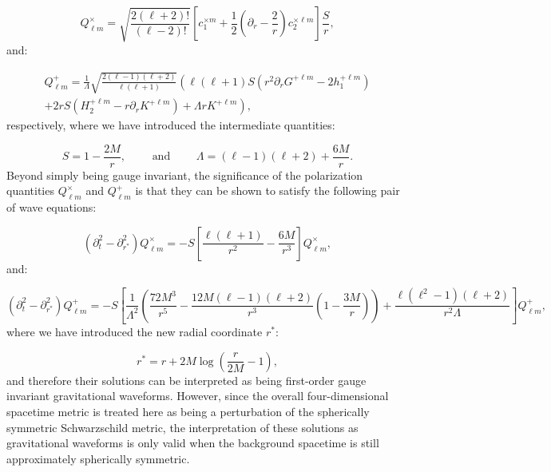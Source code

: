 \documentclass{article}
\begin{document}
\begin{equation}
Q_{\ell m}^{\times} = \sqrt{\frac{2 \left( \ell + 2 \right)!}{\left( \ell - 2 \right)!}} \left[ c_{1}^{\times m} + \frac{1}{2} \left( \partial_r - \frac{2}{r} \right) c_{2}^{\times \ell m} \right] \frac{S}{r},
\end{equation}
and:

\begin{multline}
Q_{\ell m}^{+} = \frac{1}{\Lambda} \sqrt{\frac{2 \left( \ell - 1 \right) \left( \ell + 2 \right)}{\ell \left( \ell + 1 \right)}} \left( \ell \left( \ell + 1 \right) S \left( r^2 \partial_r G^{+ \ell m} - 2 h_{1}^{+ \ell m} \right) \right.\\
\left. + 2 r S \left( H_{2}^{+ \ell m} - r \partial_r K^{+ \ell m} \right) + \Lambda r K^{+ \ell m} \right),
\end{multline}
respectively, where we have introduced the intermediate quantities:

\begin{equation}
S = 1 - \frac{2M}{r}, \qquad \text{ and } \qquad \Lambda = \left( \ell - 1 \right) \left( \ell + 2 \right) + \frac{6M}{r}.
\end{equation}
Beyond simply being gauge invariant, the significance of the polarization quantities ${Q_{\ell m}^{\times}}$ and ${Q_{\ell m}^{+}}$ is that they can be shown to satisfy the following pair of wave equations:

\begin{equation}
\left( \partial_{t}^{2} - \partial_{r^*}^{2} \right) Q_{\ell m}^{\times} = -S \left[ \frac{\ell \left( \ell + 1 \right)}{r^2} - \frac{6M}{r^3} \right] Q_{\ell m}^{\times},
\end{equation}
and:

\begin{equation}
\left( \partial_{t}^{2} - \partial_{r^*}^{2} \right) Q_{\ell m}^{+} = -S \left[ \frac{1}{\Lambda^2} \left( \frac{72 M^3}{r^5} - \frac{12 M \left( \ell - 1 \right) \left( \ell + 2 \right)}{r^3} \left( 1 - \frac{3M}{r} \right) \right) + \frac{\ell \left( \ell^2 - 1 \right) \left( \ell + 2 \right)}{r^2 \Lambda} \right] Q_{\ell m}^{+},
\end{equation}
where we have introduced the new radial coordinate ${r^*}$:

\begin{equation}
r^* = r + 2M \log \left( \frac{r}{2M} - 1 \right),
\end{equation}
and therefore their solutions can be interpreted as being first-order gauge invariant gravitational waveforms. However, since the overall four-dimensional spacetime metric is treated here as being a perturbation of the spherically symmetric Schwarzschild metric, the interpretation of these solutions as gravitational waveforms is only valid when the background spacetime is still approximately spherically symmetric.
\end{document}
